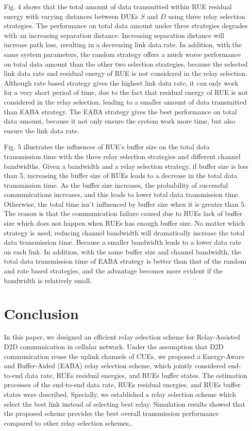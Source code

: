\documentclass[conference]{IEEEtran}
\begin{document}
Fig. 4 shows that the total amount of data transmitted within RUE residual energy with varying distances between DUEs $S$ and $D$ using three relay selection strategies. The performance on total data amount under three strategies degrades with an increasing separation distance. Increasing separation distance will increase path loss, resulting in a decreasing link data rate. In addition, with the same system parameters, the random strategy offers a much worse performance on total data amount than the other two selection strategies, because the selected link data rate and residual energy of RUE is not considered in the relay selection. Although rate based strategy gives the highest link data rate, it can only work for a very short period of time, due to the fact that residual energy of RUE is not considered in the relay selection, leading to a smaller amount of data transmitted than EABA strategy. The EABA strategy gives the best performance on total data amount, because it not only ensure the system work more time, but also ensure the link data rate.

Fig. 5 illustrates the influences of RUE's buffer size on the total data transmission time with the three relay selection strategies and different channel bandwidths. Given a bandwidth and a relay selection strategy, if buffer size is less than 5, increasing the buffer size of RUEs leads to a decrease in the total data transmission time. As the buffer size increases, the probability of successful communications increases, and this leads to lower total data transmission time. Otherwise, the total time isn't influenced by buffer size when it is greater than 5. The reason is that the communication failure caused due to RUEs lack of buffer size which does not happen when RUEs has enough buffer size. No matter which strategy is used, reducing channel bandwidth will dramatically increase the total data transmission time. Because a smaller bandwidth leads to a lower data rate on each link. In addition, with the same buffer size and channel bandwidth, the total data transmission time of EABA strategy is better than that of the random and rate based strategies, and the advantage becomes more evident if the bandwidth is relatively small.

\section{Conclusion}
In this paper, we designed an efficient relay selection scheme for Relay-Assisted D2D communication in cellular network. Under the assumption that D2D communication reuse the uplink channels of CUEs, we proposed a Energy-Aware and Buffer-Aided (EABA) relay selection scheme, which jointly considered end-to-end data rate, RUEs residual energies, and RUEs buffer states. The estimation processes of the end-to-end data rate, RUEs residual energies, and RUEs buffer states were described. Specially, we established a relay selection scheme which select the best link instead of selecting best relay. Simulation results showed that the proposed scheme provides the best overall transmission performance compared to other relay selection schemes,.
\end{document}
